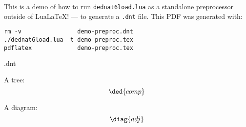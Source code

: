 \documentclass[oneside]{book}
\begin{document}
This is a demo of how to run {\tt dednat6load.lua} as a standalone
preprocessor outside of Lua\LaTeX! --- to generate a {\tt .dnt} file.
This PDF was generated with:

\begin{verbatim}
rm -v                demo-preproc.dnt
./dednat6load.lua -t demo-preproc.tex
pdflatex             demo-preproc.tex
\end{verbatim}

\bigskip
\bigskip


\jobname.dnt

A tree:
%
%
$$\ded{comp}$$



\def\catA{\mathbf{A}}
\def\catB{\mathbf{B}}

A diagram:
%
$$\diag{adj}
$$
\end{document}

